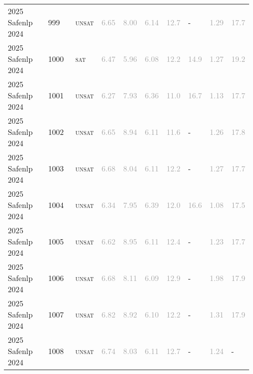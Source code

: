 \begin{center}
{\begin{longtable}{@{}llllllllll@{}}
2025 Safenlp 2024 & 999 & ~\textsc{unsat} & \textcolor{darkgray}{6.65} & \textcolor{darkgray}{8.00} & \textcolor{darkgray}{6.14} & \textcolor{darkgray}{12.7} & - & \textcolor{darkgray}{1.29} & \textcolor{darkgray}{17.7} \\
2025 Safenlp 2024 & 1000 & ~\textsc{sat} & \textcolor{darkgray}{6.47} & \textcolor{darkgray}{5.96} & \textcolor{darkgray}{6.08} & \textcolor{darkgray}{12.2} & \textcolor{darkgray}{14.9} & \textcolor{darkgray}{1.27} & \textcolor{darkgray}{19.2} \\
2025 Safenlp 2024 & 1001 & ~\textsc{unsat} & \textcolor{darkgray}{6.27} & \textcolor{darkgray}{7.93} & \textcolor{darkgray}{6.36} & \textcolor{darkgray}{11.0} & \textcolor{darkgray}{16.7} & \textcolor{darkgray}{1.13} & \textcolor{darkgray}{17.7} \\
2025 Safenlp 2024 & 1002 & ~\textsc{unsat} & \textcolor{darkgray}{6.65} & \textcolor{darkgray}{8.94} & \textcolor{darkgray}{6.11} & \textcolor{darkgray}{11.6} & - & \textcolor{darkgray}{1.26} & \textcolor{darkgray}{17.8} \\
2025 Safenlp 2024 & 1003 & ~\textsc{unsat} & \textcolor{darkgray}{6.68} & \textcolor{darkgray}{8.04} & \textcolor{darkgray}{6.11} & \textcolor{darkgray}{12.2} & - & \textcolor{darkgray}{1.27} & \textcolor{darkgray}{17.7} \\
2025 Safenlp 2024 & 1004 & ~\textsc{unsat} & \textcolor{darkgray}{6.34} & \textcolor{darkgray}{7.95} & \textcolor{darkgray}{6.39} & \textcolor{darkgray}{12.0} & \textcolor{darkgray}{16.6} & \textcolor{darkgray}{1.08} & \textcolor{darkgray}{17.5} \\
2025 Safenlp 2024 & 1005 & ~\textsc{unsat} & \textcolor{darkgray}{6.62} & \textcolor{darkgray}{8.95} & \textcolor{darkgray}{6.11} & \textcolor{darkgray}{12.4} & - & \textcolor{darkgray}{1.23} & \textcolor{darkgray}{17.7} \\
2025 Safenlp 2024 & 1006 & ~\textsc{unsat} & \textcolor{darkgray}{6.68} & \textcolor{darkgray}{8.11} & \textcolor{darkgray}{6.09} & \textcolor{darkgray}{12.9} & - & \textcolor{darkgray}{1.98} & \textcolor{darkgray}{17.9} \\
2025 Safenlp 2024 & 1007 & ~\textsc{unsat} & \textcolor{darkgray}{6.82} & \textcolor{darkgray}{8.92} & \textcolor{darkgray}{6.10} & \textcolor{darkgray}{12.2} & - & \textcolor{darkgray}{1.31} & \textcolor{darkgray}{17.9} \\
2025 Safenlp 2024 & 1008 & ~\textsc{unsat} & \textcolor{darkgray}{6.74} & \textcolor{darkgray}{8.03} & \textcolor{darkgray}{6.11} & \textcolor{darkgray}{12.7} & - & \textcolor{darkgray}{1.24} & - \\

\end{longtable}}
\end{center}
